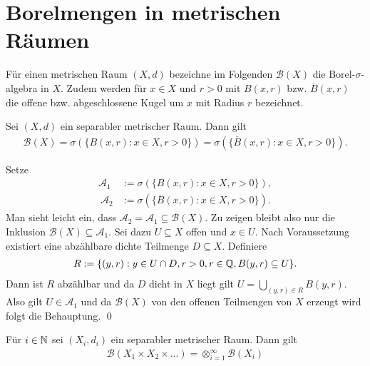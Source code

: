 \section{Borelmengen in metrischen Räumen}
Für einen metrischen Raum $(X,d)$ bezeichne im Folgenden $\mathcal{B}(X)$ die Borel-$\sigma$-algebra in $X$. 
Zudem werden für $x \in X$ und $r>0$ mit $B(x, r)$ bzw. $\overline{B}(x,r)$ die offene bzw. abgeschlossene Kugel um $x$ mit Radius $r$ bezeichnet.
\begin{proposition}
    Sei $(X,d)$ ein separabler metrischer Raum. Dann gilt
    \begin{align*}
        \mathcal{B}(X) = \sigma(\{B(x,r): x \in X, r > 0 \}) = \sigma(\{\overline{B}(x,r): x \in X, r > 0 \}). 
    \end{align*}
\end{proposition}
\begin{proof*}
    Setze 
    \begin{align*}
        \mathcal{A}_1 &:= \sigma(\{B(x,r): x \in X, r > 0 \}), \\\ 
        \mathcal{A}_2 &:= \sigma(\{\overline{B}(x,r): x \in X, r > 0 \}). 
    \end{align*}
    Man sieht leicht ein, dass $\mathcal{A}_2 = \mathcal{A}_1 \subseteq \mathcal{B}(X)$. Zu zeigen bleibt also nur die Inklusion $\mathcal{B}(X) \subseteq \mathcal{A}_1$.
    Sei dazu $U \subseteq X$ offen und $x \in U$. Nach Voraussetzung existiert eine abzählbare dichte Teilmenge $D \subseteq X$. Definiere 
    \begin{align*}
        R := \{(y,r) : y \in U \cap D, r > 0, r \in \mathbb{Q}, B(y,r) \subseteq U \}.
    \end{align*}
    Dann ist $R$ abzählbar und da $D$ dicht in $X$ liegt gilt $U = \bigcup_{(y,r) \in R}B(y,r)$. 
    Also gilt $U \in \mathcal{A}_1$ und da $\mathcal{B}(X)$ von den offenen Teilmengen von $X$ erzeugt wird folgt die Behauptung. \qed
\end{proof*}

\begin{proposition}
    Für $i \in \mathbb{N}$ sei $(X_i, d_i)$ ein separabler metrischer Raum. Dann gilt
    \begin{align*}
        \mathcal{B}(X_1 \times X_2 \times ...) = \otimes_{i=1}^{\infty}\mathcal{B}(X_i)
    \end{align*}
\end{proposition}

